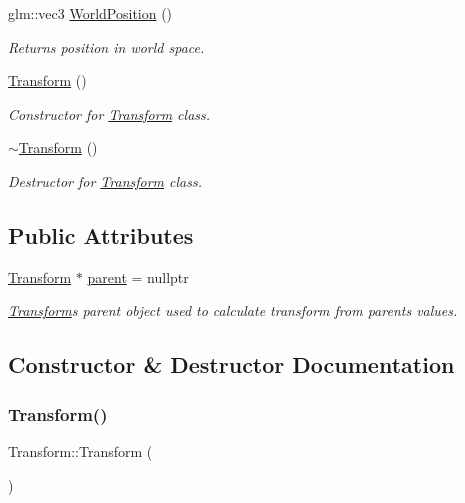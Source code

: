\begin{DoxyCompactItemize}
glm\+::vec3 \mbox{\hyperlink{class_transform_a631ff0990e3297ed142ce6f5259c2c1a}{World\+Position}} ()
\begin{DoxyCompactList}\small\item\em Returns position in world space. \end{DoxyCompactList}\item 
\mbox{\hyperlink{class_transform_aa08ca4266efabc768973cdeea51945ab}{Transform}} ()
\begin{DoxyCompactList}\small\item\em Constructor for \mbox{\hyperlink{class_transform}{Transform}} class. \end{DoxyCompactList}\item 
\mbox{\hyperlink{class_transform_aa72e286c069850db80927b0e6554cd3e}{$\sim$\+Transform}} ()
\begin{DoxyCompactList}\small\item\em Destructor for \mbox{\hyperlink{class_transform}{Transform}} class. \end{DoxyCompactList}\end{DoxyCompactItemize}
\subsection*{Public Attributes}
\begin{DoxyCompactItemize}
\item 
\mbox{\hyperlink{class_transform}{Transform}} $\ast$ \mbox{\hyperlink{class_transform_aa1e92491c9905869a108ec09a08e5eb4}{parent}} = nullptr
\begin{DoxyCompactList}\small\item\em \mbox{\hyperlink{class_transform}{Transform}}\textquotesingle{}s parent object used to calculate transform from parent\textquotesingle{}s values. \end{DoxyCompactList}\end{DoxyCompactItemize}


\subsection{Constructor \& Destructor Documentation}
\mbox{\label{class_transform_aa08ca4266efabc768973cdeea51945ab}} 
\subsubsection{\texorpdfstring{Transform()}{Transform()}}
{\footnotesize\ttfamily Transform\+::\+Transform (\begin{DoxyParamCaption}{ }\end{DoxyParamCaption})}



